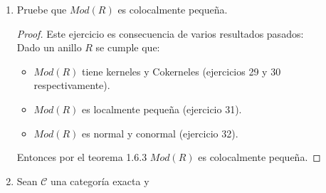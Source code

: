 \documentclass{article}
\begin{document}
\begin{enumerate}[label=\textbf{Ej \arabic*.}]
\begin{proof}
			 Ahora supongamos que $\catarrow{\alpha}{M}{N}{}$ es epi en $Mod\lrprth{R}$ y denotemos por $\beta$ al morfismo inclusión de $Ker\lrprth{\alpha}$ en $M$. Afirmamos que $\alpha$ es un cokernel para $\beta$, en efecto:\\
			Como $Ker\lrprth{\alpha}=\lrbrack{m\in M\ \vline\ \alpha\lrprth{m}=0_N}$, entonces $\alpha\beta=0$. Sea $\catarrow{\alpha'}{M}{N'}{}$ en $Mod\lrprth{R}$ tal que $\alpha'\beta=0$, así 
			\begin{equation*}
				Ker\lrprth{\alpha'}\supseteq Im\lrprth{\beta}=Ker\lrprth{\alpha}.
			\end{equation*}
			Como $\alpha$ es epi se tiene que $N=Im\lrprth{\alpha}$. Así, consideremos la aplicación
			\begin{align*}
				\descapp{\gamma}{N}{N'}{\alpha\lrprth{m}}{\alpha'\lrprth{m}}{,}
			\end{align*}
			la cual es una función bien definida, puesto que si $m,o\in M$ son tales que $\alpha\lrprth{m}=\alpha\lrprth{o}$, entonces
			\begin{align*}
				m-o&\in Ker\lrprth{\alpha}\subseteq Ker\lrprth{\alpha'}\\
				\implies \alpha'\lrprth{m}&=\alpha'\lrprth{o}.
			\end{align*}
			Más aún, es un morfismo de $R$-módulos, pues $\alpha$ y $\alpha'$ lo son, que satisface que $\gamma\alpha=\alpha'$. Finalmente $\gamma$ es el único morfismo de $R$-módulos que satisface la igualdad anterior dado que $\alpha$ es epi.\\
		\end{proof}
\item Pruebe que $Mod(R)$ es colocalmente pequeña.
\begin{proof}
Este ejercicio es consecuencia de varios resultados pasados:\\
Dado un anillo $R$ se cumple que:
\begin{itemize}
\item $Mod(R)$ tiene kerneles y Cokerneles (ejercicios 29 y 30 respectivamente).
\item $Mod(R)$ es localmente pequeña (ejercicio 31).
\item $Mod(R)$ es normal y conormal (ejercicio 32).
\end{itemize}
Entonces por el teorema 1.6.3 $Mod(R)$ es colocalmente pequeña.
\end{proof}
\item Sean $\mathscr{C}$ una categoría exacta y \\


\end{enumerate}
\end{document}
